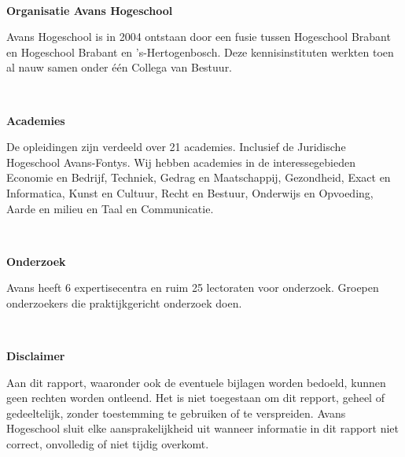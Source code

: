 

\newpage

\thispagestyle{nofoot}

~\vfill




\textcolor{avansred}{\textbf{\fontsize{13pt}{19.5pt}\selectfont Organisatie Avans Hogeschool}}

Avans Hogeschool is in 2004 ontstaan door een fusie tussen Hogeschool Brabant en Hogeschool Brabant en 's-Hertogenbosch. Deze kennisinstituten werkten toen al nauw samen onder \'{e}\'{e}n Collega van Bestuur.

\

\textcolor{avansred}{\textbf{\fontsize{13pt}{19.5pt}\selectfont Academies}}

De opleidingen zijn verdeeld over 21 academies. Inclusief de Juridische Hogeschool Avans-Fontys. Wij hebben academies in de interessegebieden Economie en Bedrijf, Techniek, Gedrag en Maatschappij, Gezondheid, Exact en Informatica, Kunst en Cultuur, Recht en Bestuur, Onderwijs en Opvoeding, Aarde en milieu en Taal en Communicatie.

\

\textcolor{avansred}{\textbf{\fontsize{13pt}{19.5pt}\selectfont Onderzoek}}

Avans heeft 6 expertisecentra en ruim 25 lectoraten voor onderzoek. Groepen onderzoekers die praktijkgericht onderzoek doen.

\

\textcolor{avansred}{\textbf{\fontsize{13pt}{19.5pt}\selectfont Disclaimer}}

Aan dit rapport, waaronder ook de eventuele bijlagen worden bedoeld, kunnen geen rechten worden ontleend. Het is niet toegestaan om dit repport, geheel of gedeeltelijk, zonder toestemming te gebruiken of te verspreiden. Avans Hogeschool sluit elke aansprakelijkheid uit wanneer informatie in dit rapport niet correct, onvolledig of niet tijdig overkomt.

\

\

